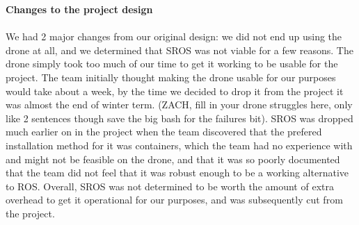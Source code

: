 \documentclass[IEEEtran,letterpaper,10pt,notitlepage,draftclsnofoot,onecolumn]{article}
\begin{document}
\LARGE\textbf{Changes to the project design\\ \\}
\normalsize
We had 2 major changes from our original design: we did not end up using 
the drone at all, and we determined that SROS was not viable for a few 
reasons. The drone simply took too much of our time to get it working to be 
usable for the project. The team initially thought making the drone usable 
for our purposes would take about a week, by the time we decided to drop it 
from the project it was almost the end of winter term. (ZACH, fill in your 
drone struggles here, only like 2 sentences though save the big bash for 
the failures bit). SROS was dropped much earlier on in the project when 
the team discovered that the prefered installation method for it was 
containers, which the team had no experience with and might not be feasible 
on the drone, and that it was so poorly documented that the team did not feel 
that it was robust enough to be a working alternative to ROS. Overall, SROS 
was not determined to be worth the amount of extra overhead to get it 
operational for our purposes, and was subsequently cut from the project.
\end{document}
